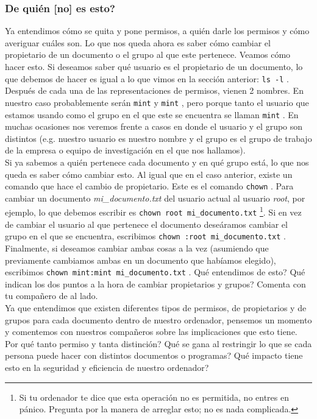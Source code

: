 \documentclass[10pt,letterpaper]{article}
\newcommand{\inlinecode}[1]{
\colorbox{light-gray}{\texttt{#1}}
}
\begin{document}
\subsubsection{De qui\'en [no] es esto?}

Ya entendimos c\'omo se quita y pone permisos, a qui\'en darle los permisos y c\'omo averiguar cu\'ales son. Lo que nos queda ahora es saber c\'omo cambiar el propietario de un documento o el grupo al que este pertenece. Veamos c\'omo hacer esto. Si deseamos saber qu\'e usuario es el propietario de un documento, lo que debemos de hacer es igual a lo que vimos en la secci\'on anterior: \inlinecode{ls -l}. Despu\'es de cada una de las representaciones de permisos, vienen 2 nombres. En nuestro caso probablemente ser\'an \inlinecode{mint} y \inlinecode{mint}, pero porque tanto el usuario que estamos usando como el grupo en el que este se encuentra se llaman \inlinecode{mint}. En muchas ocasiones nos veremos frente a casos en donde el usuario y el grupo son distintos (e.g. nuestro usuario es nuestro nombre y el grupo es el grupo de trabajo de la empresa o equipo de investigaci\'on en el que nos hallamos).\\

Si ya sabemos a qui\'en pertenece cada documento y en qu\'e grupo est\'a, lo que nos queda es saber c\'omo cambiar esto. Al igual que en el caso anterior, existe un comando que hace el cambio de propietario. Este es el comando \inlinecode{chown}. Para cambiar un documento \textit{mi\_documento.txt} del usuario actual al usuario \textit{root}, por ejemplo, lo que debemos escribir es \inlinecode{chown root mi\_documento.txt}\footnote{Si tu ordenador te dice que esta operaci\'on no es permitida, no entres en p\'anico. Pregunta por la manera de arreglar esto; no es nada complicada.}. Si en vez de cambiar el usuario al que pertenece el documento dese\'aramos cambiar el grupo en el que se encuentra, escribimos \inlinecode{chown :root mi\_documento.txt}. Finalmente, si deseamos cambiar ambas cosas a la vez (asumiendo que previamente cambiamos ambas en un documento que hab\'iamos elegido), escribimos \inlinecode{chown mint:mint mi\_documento.txt}. Qu\'e entendimos de esto? Qu\'e indican los dos puntos a la hora de cambiar propietarios y grupos? Comenta con tu compa\~nero de al lado.\\

Ya que entendimos que existen diferentes tipos de permisos, de propietarios y de grupos para cada documento dentro de nuestro ordenador, pensemos un momento y comentemos con nuestros compa\~neros sobre las implicaciones que esto tiene. Por qu\'e tanto permiso y tanta distinci\'on? Qu\'e se gana al restringir lo que se cada persona puede hacer con distintos documentos o programas? Qu\'e impacto tiene esto en la seguridad y eficiencia de nuestro ordenador?
\end{document}
